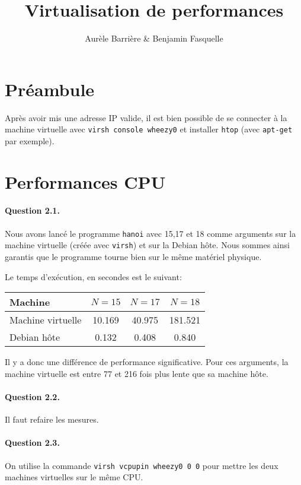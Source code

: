 \documentclass[12pt]{article}
\title{Virtualisation de performances}
\author{Aurèle Barrière \& Benjamin Fasquelle}
\begin{document}
\maketitle
\def\code#1{\texttt{#1}}

\section{Préambule}
Après avoir mis une adresse IP valide, il est bien possible de se connecter à la machine virtuelle avec \code{virsh console wheezy0} et installer \code{htop} (avec \code{apt-get} par exemple).

\section{Performances CPU}

\paragraph{Question 2.1.} Nous avons lancé le programme \texttt{hanoi} avec 15,17 et 18 comme arguments sur la machine virtuelle (créée avec \code{virsh}) et sur la Debian hôte. Nous sommes ainsi garantis que le programme tourne bien sur le même matériel physique.

Le temps d'exécution, en secondes est le suivant:

\begin{tabular}{| l | c | c | c |}\hline
Machine & $N=15$ & $N=17$ & $N=18$ \\\hline
Machine virtuelle & 10.169 & 40.975 & 181.521 \\\hline
Debian hôte & 0.132 & 0.408 & 0.840\\\hline
\end{tabular}

Il y a donc une différence de performance significative. Pour ces arguments, la machine virtuelle est entre 77 et 216 fois plus lente que sa machine hôte.

\paragraph{Question 2.2.} 
Il faut refaire les mesures.

\paragraph{Question 2.3.}
On utilise la commande \code{virsh vcpupin wheezy0 0 0} pour mettre les deux machines virtuelles sur le même CPU.
\end{document}

